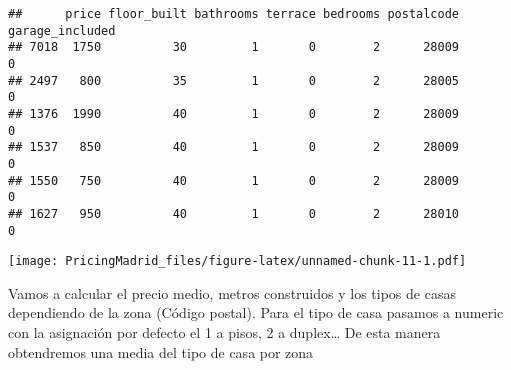 \documentclass[
]{article}
\newenvironment{Shaded}{\begin{snugshade}}{\end{snugshade}}
\newcommand{\AttributeTok}[1]{\textcolor[rgb]{0.77,0.63,0.00}{#1}}
\newcommand{\ConstantTok}[1]{\textcolor[rgb]{0.00,0.00,0.00}{#1}}
\newcommand{\DecValTok}[1]{\textcolor[rgb]{0.00,0.00,0.81}{#1}}
\newcommand{\FunctionTok}[1]{\textcolor[rgb]{0.00,0.00,0.00}{#1}}
\newcommand{\NormalTok}[1]{#1}
\newcommand{\OtherTok}[1]{\textcolor[rgb]{0.56,0.35,0.01}{#1}}
\newcommand{\SpecialCharTok}[1]{\textcolor[rgb]{0.00,0.00,0.00}{#1}}
\newcommand{\StringTok}[1]{\textcolor[rgb]{0.31,0.60,0.02}{#1}}
\begin{document}
\begin{verbatim}
##      price floor_built bathrooms terrace bedrooms postalcode garage_included
## 7018  1750          30         1       0        2      28009               0
## 2497   800          35         1       0        2      28005               0
## 1376  1990          40         1       0        2      28009               0
## 1537   850          40         1       0        2      28009               0
## 1550   750          40         1       0        2      28009               0
## 1627   950          40         1       0        2      28010               0
\end{verbatim}

\begin{Shaded}
\end{Shaded}

\texttt{[image: PricingMadrid\_files/figure-latex/unnamed-chunk-11-1.pdf]}

Vamos a calcular el precio medio, metros construidos y los tipos de
casas dependiendo de la zona (Código postal). Para el tipo de casa
pasamos a numeric con la asignación por defecto el 1 a pisos, 2 a
duplex\ldots{} De esta manera obtendremos una media del tipo de casa por
zona
\end{document}
